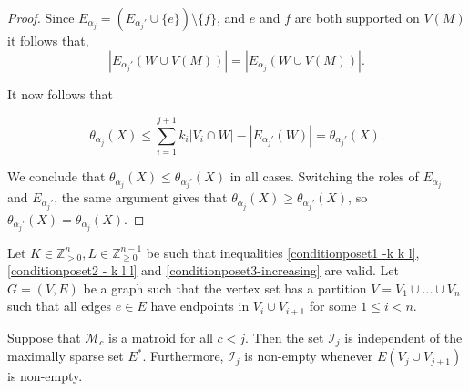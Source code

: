 \documentclass{article}
\begin{document}
\begin{proof}
Since $E_{\alpha_{j}} = \left (E_{\alpha_{j}'} \cup \{e\}\right) \setminus \{f\}$, and $e$ and $f$ are both supported on $V(M)$ it follows that,
$$|E_{\alpha_{j}'}(W\cup V(M))|=|E_{\alpha_{j}}(W\cup V(M))|.$$

It now follows that

$$\theta_{\alpha_j}(X) \leq  \sum_{i=1}^{j+1} k_i |V_i \cap W| - |E_{\alpha_{j}'}(W)| = \theta_{\alpha_j'}(X).$$


We conclude that $\theta_{\alpha_j}(X)\leq \theta_{\alpha_j'}(X)$ in all cases. Switching the roles of $E_{\alpha_j}$ and $E_{\alpha_j'}$, the same argument gives that $\theta_{\alpha_j}(X) \geq \theta_{\alpha_j'}(X)$, so $\theta_{\alpha_j'}(X) = \theta_{\alpha_j}(X)$. 
\end{proof}

\begin{lemma}\label{Matroid_1}
Let $K\in \mathbb{Z}_{>0}^{n}, L\in \mathbb{Z}_{\geq 0}^{n-1}$ be such that inequalities \eqref{conditionposet1 -k k l}, \eqref{conditionposet2 - k l l} and \eqref{conditionposet3-increasing} are valid. Let $G=(V,E)$ be a graph such that the vertex set has a partition $V=V_1\cup \dots \cup V_n$ such that all edges $e\in E$ have endpoints in $V_{i} \cup V_{i+1}$ for some $1 \leq i < n$.

Suppose that $\mathcal{M}_c$ is a matroid for all $c < j$. Then the set $\mathcal{I}_{j}$ is independent of the maximally sparse set $E^*$. Furthermore, $\mathcal{I}_j$ is non-empty whenever $E(V_{j} \cup V_{j+1})$ is non-empty.
\end{lemma}
\end{document}
